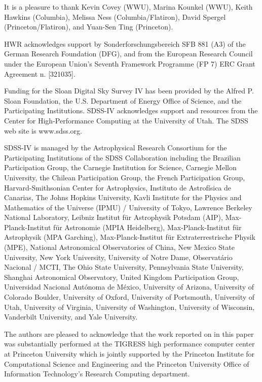 \documentclass[modern, letterpaper]{aastex62}
\begin{document}
\acknowledgements

It is a pleasure to thank
Kevin Covey (WWU),
Marina Kounkel (WWU),
Keith Hawkins (Columbia),
Melissa Ness (Columbia/Flatiron),
David Spergel (Princeton/Flatiron),
and Yuan-Sen Ting (Princeton).

HWR acknowledges support by Sonderforschungsbereich SFB 881 (A3) of the German
Research Foundation (DFG), and from the European Research Council under the
European Union’s Seventh Framework Programme (FP 7) ERC Grant Agreement
n. [321035].

Funding for the Sloan Digital Sky Survey IV has been provided by the Alfred P. Sloan Foundation, the U.S. Department of Energy Office of Science, and the Participating Institutions. SDSS-IV acknowledges
support and resources from the Center for High-Performance Computing at
the University of Utah. The SDSS web site is www.sdss.org.

SDSS-IV is managed by the Astrophysical Research Consortium for the
Participating Institutions of the SDSS Collaboration including the
Brazilian Participation Group, the Carnegie Institution for Science,
Carnegie Mellon University, the Chilean Participation Group, the French Participation Group, Harvard-Smithsonian Center for Astrophysics,
Instituto de Astrof\'isica de Canarias, The Johns Hopkins University,
Kavli Institute for the Physics and Mathematics of the Universe (IPMU) /
University of Tokyo, Lawrence Berkeley National Laboratory,
Leibniz Institut f\"ur Astrophysik Potsdam (AIP),
Max-Planck-Institut f\"ur Astronomie (MPIA Heidelberg),
Max-Planck-Institut f\"ur Astrophysik (MPA Garching),
Max-Planck-Institut f\"ur Extraterrestrische Physik (MPE),
National Astronomical Observatories of China, New Mexico State University,
New York University, University of Notre Dame,
Observat\'ario Nacional / MCTI, The Ohio State University,
Pennsylvania State University, Shanghai Astronomical Observatory,
United Kingdom Participation Group,
Universidad Nacional Aut\'onoma de M\'exico, University of Arizona,
University of Colorado Boulder, University of Oxford, University of Portsmouth,
University of Utah, University of Virginia, University of Washington, University of Wisconsin,
Vanderbilt University, and Yale University.

The authors are pleased to acknowledge that the work reported on in this
paper was substantially performed at the TIGRESS high performance computer
center at Princeton University which is jointly supported by the Princeton
Institute for Computational Science and Engineering and the Princeton
University Office of Information Technology's Research Computing department.
\end{document}
